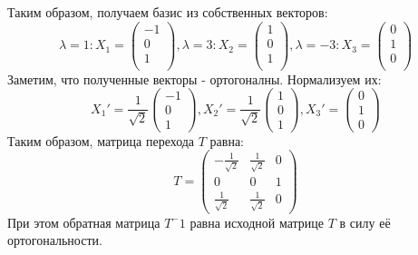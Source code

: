 \documentclass[12pt, a4paper]{article}
\begin{document}
Таким образом, получаем базис из собственных векторов:
\begin{equation} \label{cBasis}
\lambda = 1: X_1 =\begin{pmatrix}
-1\\
0\\
1\\
\end{pmatrix}, \lambda = 3: X_2 = \begin{pmatrix}
1\\
0\\
1\\
\end{pmatrix} , \lambda = -3: X_3 = \begin{pmatrix}
0\\
1\\
0\\
\end{pmatrix}
\end{equation}
Заметим, что полученные векторы - ортогоналны. Нормализуем их:
\begin{equation*}
X_1' = \frac{1}{\sqrt{2}}\begin{pmatrix}
-1\\
0\\
1
\end{pmatrix},
X_2' = \frac{1}{\sqrt{2}}\begin{pmatrix}
1\\
0\\
1
\end{pmatrix},
X_3' = \begin{pmatrix}
0\\
1\\
0
\end{pmatrix}
\end{equation*}
Таким образом, матрица перехода $T$ равна:
\begin{equation*}
T= \begin{pmatrix}
-\frac{1}{\sqrt{2}} & \frac{1}{\sqrt{2}} & 0\\
0 & 0 & 1\\
\frac{1}{\sqrt{2}} & \frac{1}{\sqrt{2}} & 0
\end{pmatrix}
\end{equation*}
При этом обратная матрица $T^-1$ равна исходной матрице $T$ в силу её ортогональности.
\end{document}
